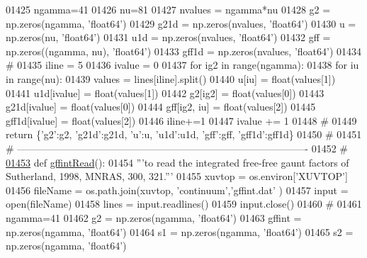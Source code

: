 \begin{DoxyCode}
{{{{{{{{{{{{{{01425     ngamma=41
01426     nu=81
01427     nvalues = ngamma*nu
01428     g2 = np.zeros(ngamma, \textcolor{stringliteral}{'float64'})
01429     g21d = np.zeros(nvalues, \textcolor{stringliteral}{'float64'})
01430     u = np.zeros(nu, \textcolor{stringliteral}{'float64'})
01431     u1d = np.zeros(nvalues, \textcolor{stringliteral}{'float64'})
01432     gff = np.zeros((ngamma, nu), \textcolor{stringliteral}{'float64'})
01433     gff1d = np.zeros(nvalues, \textcolor{stringliteral}{'float64'})
01434     \textcolor{comment}{#}
01435     iline = 5
01436     ivalue = 0
01437     \textcolor{keywordflow}{for} ig2 \textcolor{keywordflow}{in} range(ngamma):
01438         \textcolor{keywordflow}{for} iu \textcolor{keywordflow}{in} range(nu):
01439             values = lines[iline].split()
01440             u[iu] = float(values[1])
01441             u1d[ivalue] = float(values[1])
01442             g2[ig2] = float(values[0])
01443             g21d[ivalue] = float(values[0])
01444             gff[ig2, iu] = float(values[2])
01445             gff1d[ivalue] = float(values[2])
01446             iline+=1
01447             ivalue += 1
01448     \textcolor{comment}{#}
01449     \textcolor{keywordflow}{return} \{\textcolor{stringliteral}{'g2'}:g2, \textcolor{stringliteral}{'g21d'}:g21d,  \textcolor{stringliteral}{'}\textcolor{stringliteral}{u':u, '}u1d':u1d,  'gff':gff,  'gff1d':gff1d\}
01450     \textcolor{comment}{#}
01451     \textcolor{comment}{# ----------------------------------------------------------------------------------------}
01452     \textcolor{comment}{#}
\hypertarget{__chianti__tools_8py_source_l01453}{}\hyperlink{namespacepyneb_1_1utils_1_1__chianti__tools_a27deea720e4534912f04b54fe5c17b93}{01453} \textcolor{keyword}{def }\hyperlink{namespacepyneb_1_1utils_1_1__chianti__tools_a27deea720e4534912f04b54fe5c17b93}{gffintRead}():
01454     \textcolor{stringliteral}{'''to read the integrated free-free gaunt factors of Sutherland, 1998, MNRAS, 300, 321.'''}
01455     xuvtop = os.environ[\textcolor{stringliteral}{'XUVTOP'}]
01456     fileName = os.path.join(xuvtop, \textcolor{stringliteral}{'continuum'},\textcolor{stringliteral}{'gffint.dat'} )
01457     input = open(fileName)
01458     lines = input.readlines()
01459     input.close()
01460     \textcolor{comment}{#}
01461     ngamma=41
01462     g2 = np.zeros(ngamma, \textcolor{stringliteral}{'float64'})
01463     gffint = np.zeros(ngamma, \textcolor{stringliteral}{'float64'})
01464     s1 = np.zeros(ngamma, \textcolor{stringliteral}{'float64'})
01465     s2 = np.zeros(ngamma, \textcolor{stringliteral}{'float64'})
}}}}}}}}}}}}}}
\end{DoxyCode}
